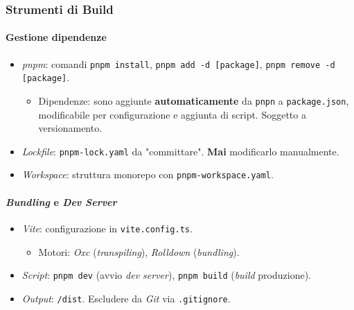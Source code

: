 \documentclass[12pt, a4paper]{article}
\begin{document}
\newpage
\subsubsection{Strumenti di Build}
\paragraph{Gestione dipendenze}
\begin{itemize}
    \item \textit{pnpm}: comandi \texttt{pnpm install}, \texttt{pnpm add -d [package]}, \texttt{pnpm remove -d [package]}.
        \begin{itemize}
            \item Dipendenze: sono aggiunte \textbf{automaticamente} da \texttt{pnpn} a \texttt{package.json}, modificabile per configurazione e aggiunta di script. Soggetto a versionamento.
        \end{itemize}
    \item \textit{Lockfile}: \texttt{pnpm-lock.yaml} da "committare". \textbf{Mai} modificarlo manualmente.
    \item \textit{Workspace}: struttura monorepo con \texttt{pnpm-workspace.yaml}.
\end{itemize}

\paragraph{\textit{Bundling} e \textit{Dev Server}}
\begin{itemize}
    \item \textit{Vite}: configurazione in \texttt{vite.config.ts}.
    \begin{itemize}
        \item Motori: \textit{Oxc} (\textit{transpiling}), \textit{Rolldown} (\textit{bundling}).
    \end{itemize}
    \item \textit{Script}: \texttt{pnpm dev} (avvio \textit{dev server}), \texttt{pnpm build} (\textit{build} produzione).
    \item \textit{Output}: \texttt{/dist}. Escludere da \textit{Git} via \texttt{.gitignore}.
\end{itemize}
\end{document}

